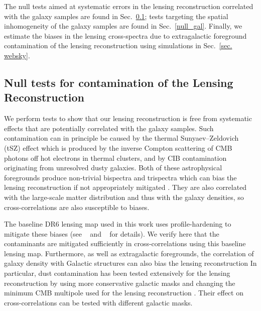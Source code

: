 \documentclass[twocolumn]{aastex631}
\def\citejap#1{\citeauthor{#1}\ \citeyear{#1}}
\begin{document}
{The null tests aimed at systematic errors in the lensing reconstruction correlated with the galaxy samples are found in Sec.~\ref{null_len}; tests targeting the spatial inhomogeneity of the galaxy samples are found in Sec.~\ref{null_gal}. Finally, we estimate the biases in the lensing cross-spectra due to extragalactic foreground contamination of the lensing reconstruction using simulations in Sec.~\ref{sec. websky}.


\subsection{Null tests for contamination of the Lensing Reconstruction}\label{null_len}

We perform tests to show that our lensing reconstruction is free from systematic effects that are potentially correlated with the galaxy samples. Such contamination can in principle be caused by the thermal Sunyaev--Zeldovich (tSZ) effect which is produced by the inverse Compton scattering of CMB photons off hot electrons in thermal clusters, and by CIB contamination originating from unresolved dusty galaxies. Both of these astrophysical foregrounds produce non-trivial bispectra and trispectra which can bias the lensing reconstruction if not appropriately mitigated \citep{maccrann2023atacama}. They are also correlated with the large-scale matter distribution and thus with the galaxy densities, so cross-correlations are also susceptible to biases. 

The baseline DR6 lensing map used in this work uses profile-hardening to mitigate these biases (see \citejap{maccrann2023atacama} and \citejap{qu2023atacama} for details). We verify here that the contaminants are mitigated sufficiently in cross-correlations using this baseline lensing map. Furthermore, as well as extragalactic foregrounds, the correlation of galaxy density with Galactic structures can also bias the lensing reconstruction In particular, dust contamination has been tested extensively for the lensing reconstruction by using more conservative galactic masks and changing the minimum CMB multipole used for the lensing reconstruction \citep{qu2023atacama}. Their effect on cross-correlations can be tested with different galactic masks.

}
\end{document}
